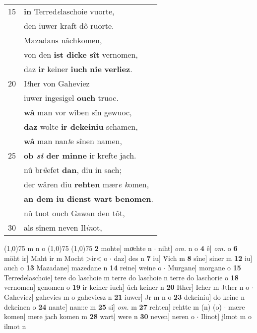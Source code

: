 \documentclass[8pt,a4paper,notitlepage]{article}
\begin{document}
\begin{table}[ht]
\begin{minipage}[t]{0.5\linewidth}
\begin{tabular}{rl}
15 & \textbf{in} Terred\textit{e}laschoie vuorte,\\ 
 & den iuwer kraft dô ruorte.\\ 
 & Mazadans nâchkomen,\\ 
 & von den \textbf{ist dicke sît} vernomen,\\ 
 & daz \textbf{ir} keiner \textbf{iuch} \textbf{nie} \textbf{verliez}.\\ 
20 & I\textit{t}her von Gaheviez\\ 
 & iuwer ingesigel \textbf{ouch} truoc.\\ 
 & \textbf{wâ} man vor wîben sîn gewuoc,\\ 
 & \textbf{daz} wolte \textbf{ir dekeiniu} schamen,\\ 
 & \textbf{wâ} man nan\textit{t}e sînen namen,\\ 
25 & \textbf{ob \textit{si} der minne} ir krefte jach.\\ 
 & nû br\textit{ü}efet \textbf{dan}, diu in sach;\\ 
 & der wâren diu \textbf{rehten} mær\textit{e k}omen,\\ 
 & \textbf{an dem iu dienst wart benomen}.\\ 
 & nû tuot ouch Gawan den tôt,\\ 
30 & als sînem neven Il\textit{in}ot,\\ 
\end{tabular}
\scriptsize
\line(1,0){75} \newline
m n o \newline
\line(1,0){75} \newline
\newline
\line(1,0){75} \newline
\textbf{2} mohte] moͯchte n  $\cdot$ niht] \textit{om.} n o \textbf{4} ê] \textit{om.} o \textbf{6} möht ir] Maht ir m Mocht >ir< o  $\cdot$ daz] des n \textbf{7} iu] V̂ich m \textbf{8} sîne] siner m \textbf{12} iu] auch o \textbf{13} Mazadane] mazedane n \textbf{14} reine] weine o  $\cdot$ Murgane] morgane o \textbf{15} Terredelaschoie] tere do laschoie m terre do laschoie n terre do laschorie o \textbf{18} vernomen] genomen o \textbf{19} ir keiner iuch] úch keiner n \textbf{20} Ither] Icher m Jther n o  $\cdot$ Gaheviez] gahevies m o gaheviesz n \textbf{21} iuwer] Jr m n o \textbf{23} dekeiniu] do keine n dekeinen o \textbf{24} nante] nan::e m \textbf{25} si] \textit{om.} m \textbf{27} rehten] rehtte m (n) (o)  $\cdot$ mære komen] mere jach komen m \textbf{28} wart] were n \textbf{30} neven] neren o  $\cdot$ Ilinot] jlmot m o ilmot n \newline
\end{minipage}
\end{table}
\end{document}
